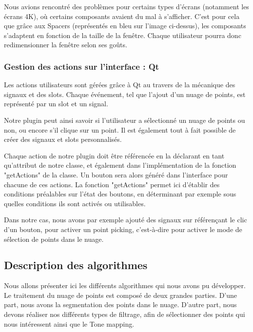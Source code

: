 \documentclass[12pt,titlepage,french]{article}
\begin{document}
Nous avions rencontré des problèmes pour certains types d'écrans (notamment les écrans 4K), où certains composants avaient du mal à s'afficher. C'est pour cela que grâce aux Spacers (représentés en bleu sur l'image ci-dessus), les composants s'adaptent en fonction de la taille de la fenêtre. Chaque utilisateur pourra donc redimensionner la fenêtre selon ses goûts.

\subsubsection{Gestion des actions sur l'interface : Qt}

Les actions utilisateurs sont gérées grâce à Qt au travers de la mécanique des signaux et des slots. Chaque événement, tel que l'ajout d'un nuage de points, est représenté par un slot et un signal. \newline

Notre plugin peut ainsi savoir si l'utilisateur a sélectionné un nuage de points ou non, ou encore s'il clique sur un point. Il est également tout à fait possible de créer des signaux et slots personnalisés. \newline

Chaque action de notre plugin doit être référencée en la déclarant en tant qu'attribut de notre classe, et également dans l'implémentation de la fonction "getActions" de la classe. Un bouton sera alors généré dans l'interface pour chacune de ces actions. La fonction "getActions" permet ici d'établir des conditions préalables sur l'état des boutons, en déterminant par exemple sous quelles conditions ils sont activés ou utilisables. \newline

Dans notre cas, nous avons par exemple ajouté des signaux sur référençant le clic d'un bouton, pour activer un point picking, c'est-à-dire pour activer le mode de sélection de points dans le nuage.

\subsection{Description des algorithmes}

Nous allons présenter ici les différents algorithmes qui nous avons pu développer. Le traitement du nuage de points est composé de deux grandes parties. D'une part, nous avons la segmentation des points dans le nuage. D'autre part, nous devons réaliser nos différents types de filtrage, afin de sélectionner des points qui nous intéressent ainsi que le Tone mapping.
\end{document}
